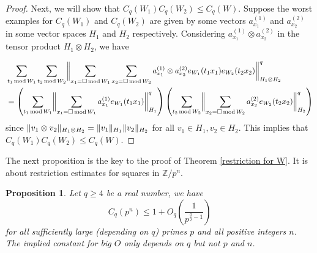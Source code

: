 \documentclass[11pt]{amsart}
\theoremstyle{plain} %
\newtheorem{prop}[thm]{Proposition}
\theoremstyle{remark}
\numberwithin{equation}{section}
\newcommand{\Z}{\mathbb{Z}}
\DeclarePairedDelimiter\norm{\lVert}{\rVert}
\newcommand{\sqwone}[1]{\sum_{#1=\square\,\mathrm{mod}\,W_1}}
\newcommand{\sqwtwo}[1]{\sum_{#1=\square\,\mathrm{mod}\,W_2}}
\newcommand{\awone}[1]{\sum_{#1\,\mathrm{mod}\,W_1}}
\newcommand{\awtwo}[1]{\sum_{#1\,\mathrm{mod}\,W_2}}
\begin{document}
\begin{proof}
    Next, we will show that $C_q(W_1)C_q(W_2)\leq C_q(W)$. Suppose the worst examples for $C_q(W_1)$ and $C_q(W_2)$ are given by some vectors $a_{x_1}^{(1)}$ and $a_{x_2}^{(2)}$ in some vector spaces $H_1$ and $H_2$ respectively. Considering $a_{x_1}^{(1)}\otimes a_{x_2}^{(2)}$ in the tensor product $H_1\otimes H_2$, we have

    \begin{equation*}
    \begin{split}
        &\awone{t_1}\awtwo{t_2}\norm[\bigg]{\sqwone{x_1}\sqwtwo{x_2}a_{x_1}^{(1)}\otimes a_{x_2}^{(2)}e_{W_1}(t_1x_1)e_{W_2}(t_2x_2)}^q_{H_1\otimes H_2}\\
        &=\left(\awone{t_1}\norm[\bigg]{\sqwone{x_1}a_{x_1}^{(1)}e_{W_1}(t_1x_1)}^q_{H_1}\right)\left(\awtwo{t_2}\norm[\bigg]{\sqwtwo{x_2}a_{x_2}^{(2)}e_{W_2}(t_2x_2)}^q_{H_2}\right)
    \end{split}        
    \end{equation*}
    since $\norm{v_1\otimes v_2}_{H_1\otimes H_2}=\norm{v_1}_{H_1}\norm{v_2}_{H_2}$ for all $v_1\in H_1,v_2\in H_2$. This implies that $C_q(W_1)C_q(W_2)\leq C_q(W)$.
    
\end{proof}

The next proposition is the key to the proof of Theorem \ref{restriction for W}. It is about restriction estimates for squares in $\Z/p^n$.

\begin{prop}\label{restriction for pn}
    Let $q\geq 4$ be a real number, we have
    \begin{equation*}
        C_q(p^n)\leq 1+O_q \left( \frac{1}{p^{\frac{q}{2}-1}} \right)
    \end{equation*}
    for all sufficiently large (depending on $q$) primes $p$ and all positive integers $n$. The implied constant for big $O$ only depends on $q$ but not $p$ and $n$.
\end{prop}
\end{document}

